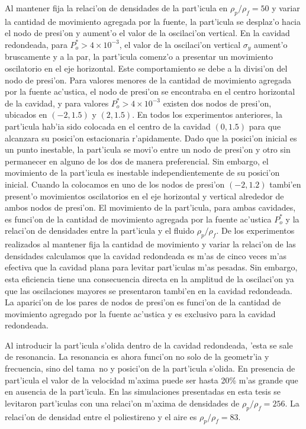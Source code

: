 Al mantener fija la relaci'on de densidades de la part'icula en $\rho_p/\rho_f=50$ y variar la 
cantidad de movimiento agregada por la fuente, la part'icula se desplaz'o hacia el nodo de presi'on 
y aument'o el valor de la oscilaci'on vertical. En la cavidad redondeada, para $P_o^\ast >4\times 10^{-3}$, 
el valor de la oscilaci'on vertical $\sigma_y$ aument'o bruscamente y a la par, la part'icula comenz'o a presentar
un movimiento oscilatorio en el eje horizontal. Este comportamiento se debe a la divisi'on del nodo de 
presi'on. Para valores menores de la cantidad de movimiento agregada por la fuente ac'ustica, el nodo de presi'on
se encontraba en el centro horizontal de la cavidad, y para valores $P_o^\ast >4\times 10^{-3}$ existen dos
nodos de presi'on, ubicados en $(-2,1.5)$ y $(2,1.5)$. En todos los experimentos anteriores, la part'icula
hab'ia sido colocada en el centro de la cavidad $(0,1.5)$ para que alcanzara su posici'on estacionaria
r'apidamente.  Dado que la posici'on inicial es un punto inestable, la part'icula se movi'o entre un nodo de
presi'on y otro sin permanecer en alguno de los dos de manera preferencial. Sin embargo, el movimiento de la part'icula es inestable
independientemente de su posici'on inicial. Cuando la colocamos en uno de los nodos de presi'on $(-2,1.2)$ tambi'en
present'o movimientos oscilatorios en el eje horizontal y vertical alrededor de ambos nodos de presi'on.
El movimiento de la part'icula, para ambas cavidades, es funci'on de la cantidad de movimiento agregada 
por la fuente ac'ustica $P_o^\ast$ y la relaci'on de densidades entre la part'icula y el fluido $\rho_p/\rho_f$.
De los experimentos realizados al mantener fija la cantidad de movimiento y variar la relaci'on de las densidades
calculamos que la cavidad redondeada es m'as de cinco veces m'as efectiva que la cavidad plana para levitar
part'iculas m'as pesadas. Sin embargo, esta eficiencia tiene una consecuencia directa en la amplitud de la oscilaci'on
ya que las oscilaciones mayores se presentaron tambi'en en la cavidad redondeada. La aparici'on de los pares de 
nodos de presi'on es funci'on de la cantidad de movimiento agregado por la fuente ac'ustica y es exclusivo para 
la cavidad redondeada.

Al introducir la part'icula s'olida dentro de la cavidad redondeada, 'esta se sale de resonancia. La resonancia
es ahora funci'on no solo de la geometr'ia y frecuencia, sino del tama~no y posici'on de la part'icula s'olida.
En presencia de part'icula  el valor de la velocidad m'axima puede ser hasta 20\% m'as grande que en ausencia
de la part'icula. En las simulaciones presentadas en esta tesis se levitaron part'iculas con una relaci'on
m'axima de densidades de $\rho_p/\rho_f = 256$. La relaci'on de densidad entre el poliestireno y el aire
es $\rho_p/\rho_f=83$.


